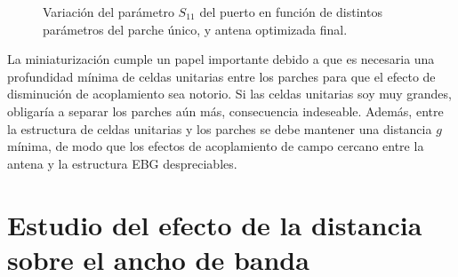 \begin{figure}[H]
	\centering 
	\hspace{30pt}
	\hspace{30pt}
	\caption{Variación del parámetro $S_{11}$ del puerto en función de distintos parámetros del parche único, y antena optimizada final.}
	\label{fig:simulaciones-microstrip-1parche}
\end{figure}

La miniaturización cumple un papel importante debido a que es necesaria una profundidad mínima de celdas unitarias entre los parches para que el efecto de disminución de acoplamiento sea notorio. Si las celdas unitarias soy muy grandes, obligaría a separar los parches aún más, consecuencia indeseable. Además, entre la estructura de celdas unitarias y los parches se debe mantener una distancia $g$ mínima, de modo que los efectos de acoplamiento de campo cercano entre la antena y la estructura EBG despreciables.

\section{Estudio del efecto de la distancia sobre el ancho de banda}
\label{sec_efecto_distancia}

